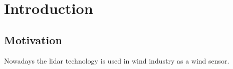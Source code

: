 \chapter{Introduction} \label{cha:INT}
\section{Motivation}\label{sec:Mot}
Nowadays the \gls{lidar} technology is used in wind industry as a wind sensor.